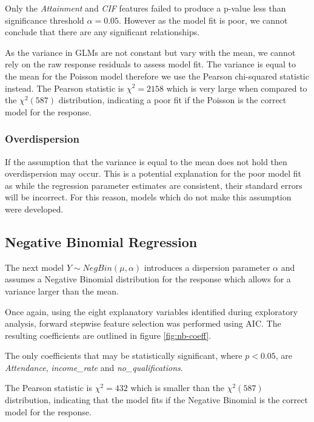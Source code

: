 \documentclass{thesis}
\begin{document}
Only the \textit{Attainment} and \textit{CIF} features failed to produce a p-value less than significance threshold $\alpha = 0.05$. However as the model fit is poor, we cannot conclude that there are any significant relationships.

As the variance in GLMs are not constant but vary with the mean, we cannot rely on the raw response residuals to assess model fit. The variance is equal to the mean for the Poisson model therefore we use the Pearson chi-squared statistic instead. The Pearson statistic is $\chi^2 = 2158$ which is very large when compared to the $\chi^2(587)$ distribution, indicating a poor fit if the Poisson is the correct model for the response.

\subsubsection{Overdispersion}

If the assumption that the variance is equal to the mean does not hold then overdispersion may occur. This is a potential explanation for the poor model fit as while the regression parameter estimates are consistent, their standard errors will be incorrect. For this reason, models which do not make this assumption were developed.

\subsection{Negative Binomial Regression}

The next model $Y \sim NegBin(\mu, \alpha)$ introduces a dispersion parameter $\alpha$ and assumes a Negative Binomial distribution for the response which allows for a variance larger than the mean.

Once again, using the eight explanatory variables identified during exploratory analysis, forward stepwise feature selection was performed using AIC. The resulting coefficients are outlined in figure \ref{fig:nb-coeff}.

The only coefficients that may be statistically significant, where $p < 0.05$, are \textit{Attendance}, \textit{income\_rate} and \textit{no\_qualifications}.

The Pearson statistic is $\chi^2 = 432$ which is smaller than the $\chi^2(587)$ distribution, indicating that the model fits if the Negative Binomial is the correct model for the response.
\end{document}

